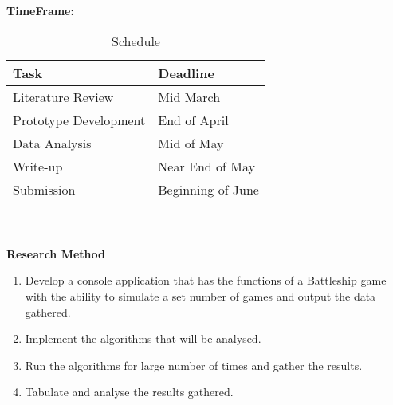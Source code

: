 \documentclass[paper=a4, fontsize=11pt]{scrartcl}
\numberwithin{equation}{section} %
\numberwithin{figure}{section} %
\numberwithin{table}{section} %
\begin{document}
\textbf{TimeFrame:}
\begin{table}[h]
    \begin{tabular}{l|l}
    \textbf{Task}                  & \textbf{Deadline}     \\ \hline
    Literature Review     & Mid March    \\
    Prototype Development & End of April \\
    Data Analysis         & Mid of May \\
    Write-up              & Near End of May \\
    Submission            & Beginning of June   \\
    \end{tabular}
    \centering
    \label{tab:schedule}
    \caption{Schedule}
\end{table}
\\\\
\textbf{Research Method} 
\begin{enumerate}
	\item Develop a console application that has the functions of a Battleship game with the ability to simulate a set number of games and output the data gathered.
	\item Implement the algorithms that will be analysed. 
	\item Run the algorithms for large number of times and gather the results.
	\item Tabulate and analyse the results gathered.
\end{enumerate}
\end{document}
